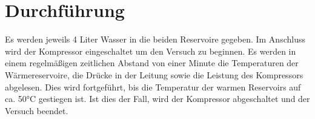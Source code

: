 \section{Durchführung}
\label{sec:Durchführung}
Es werden jeweils 4 Liter Wasser in die beiden Reservoire gegeben. Im Anschluss
wird der Kompressor eingeschaltet um den Versuch zu beginnen. Es werden in einem
regelmäßigen zeitlichen Abstand von einer Minute die Temperaturen der Wärmereservoire,
die Drücke in der Leitung sowie die Leistung des Kompressors abgelesen. Dies wird
fortgeführt, bis die Temperatur der warmen Reservoirs auf ca. 50°C gestiegen ist.
Ist dies der Fall, wird der Kompressor abgeschaltet und der Versuch beendet.
